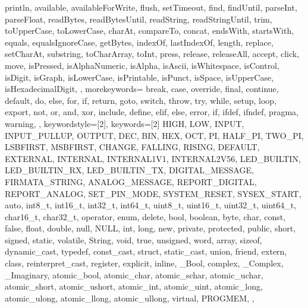 {{                println, available, availableForWrite, flush, setTimeout, find, 
                findUntil, parseInt, parseFloat, readBytes, readBytesUntil, readString, 
                readStringUntil, trim, toUpperCase, toLowerCase, charAt, compareTo, 
                concat, endsWith, startsWith, equals, equalsIgnoreCase, getBytes, 
                indexOf, lastIndexOf, length, replace, setCharAt, substring, 
                toCharArray, toInt, press, release, releaseAll, accept, click, move, 
                isPressed, isAlphaNumeric, isAlpha, isAscii, isWhitespace, isControl, 
                isDigit, isGraph, isLowerCase, isPrintable, isPunct, isSpace, 
                isUpperCase, isHexadecimalDigit, 
                }, 
  morekeywords={   %
                break, case, override, final, continue, default, do, else, for, 
                if, return, goto, switch, throw, try, while, setup, loop, export, 
                not, or, and, xor, include, define, elif, else, error, if, ifdef, 
                ifndef, pragma, warning,
                }, 
% 
%
  keywordstyle=[2]\color{arduinoBlue},   
  keywords=[2]{   %
                HIGH, LOW, INPUT, INPUT_PULLUP, OUTPUT, DEC, BIN, HEX, OCT, PI, 
                HALF_PI, TWO_PI, LSBFIRST, MSBFIRST, CHANGE, FALLING, RISING, 
                DEFAULT, EXTERNAL, INTERNAL, INTERNAL1V1, INTERNAL2V56, LED_BUILTIN, 
                LED_BUILTIN_RX, LED_BUILTIN_TX, DIGITAL_MESSAGE, FIRMATA_STRING, 
                ANALOG_MESSAGE, REPORT_DIGITAL, REPORT_ANALOG, SET_PIN_MODE, 
                SYSTEM_RESET, SYSEX_START, auto, int8_t, int16_t, int32_t, int64_t, 
                uint8_t, uint16_t, uint32_t, uint64_t, char16_t, char32_t, operator, 
                enum, delete, bool, boolean, byte, char, const, false, float, double, 
                null, NULL, int, long, new, private, protected, public, short, 
                signed, static, volatile, String, void, true, unsigned, word, array, 
                sizeof, dynamic_cast, typedef, const_cast, struct, static_cast, union, 
                friend, extern, class, reinterpret_cast, register, explicit, inline, 
                _Bool, complex, _Complex, _Imaginary, atomic_bool, atomic_char, 
                atomic_schar, atomic_uchar, atomic_short, atomic_ushort, atomic_int, 
                atomic_uint, atomic_long, atomic_ulong, atomic_llong, atomic_ullong, 
                virtual, PROGMEM,
                },  
% 
%
}
